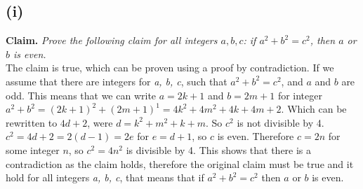\documentclass[a4paper]{article}
\begin{document}
\subsection{(i)} 
\textbf{Claim.} \textit{Prove the following claim for all integers $a,b,c$: if $a^2 + b^2 = c^2$, then $a$ or $b$ is even.}\\
The claim is true, which can be proven using a proof by contradiction.
If we assume that there are integers for \textit{a, b, c}, such that $a^2 + b^2 = c^2$, and $a$ and $b$ are odd.
This means that we can write $a = 2k + 1$ and $b = 2m + 1$ for integer $a^2 + b^2 = (2k+1)^2 + (2m+1)^1 = 4k^2 + 4m^2 + 4k + 4m + 2$.
Which can be rewritten to $4d + 2$, were $d = k^2 + m^2 + k + m$.
So $c^2$ is not divisible by 4.
$c^2 = 4d + 2 = 2(d - 1) = 2e $ for $e = d + 1$, so $c$ is even.
Therefore $c = 2n$ for some integer $n$, so $c^2 = 4n^2$ is divisible by 4.
This shows that there is a contradiction as the claim holds, therefore the original claim must be true and it hold for all integers \textit{a, b, c}, that means that if $a^2 + b^2 = c^2$ then $a$ or $b$ is even.
\end{document}
